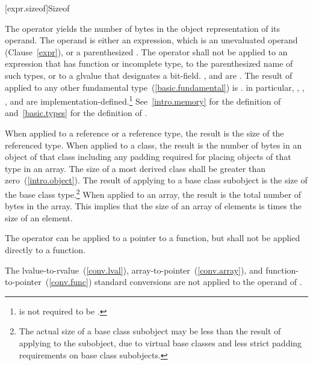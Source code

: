 [expr.sizeof]{Sizeof}

\pnum
{}%
%
%
The  operator yields the number of bytes in the object
representation of its operand. The operand is either an expression,
which is an unevaluated operand (Clause~\ref{expr}), or a parenthesized
.
%
The  operator shall not be applied to an expression that
has function or incomplete type, 
to the parenthesized name of such
types, or to a glvalue that designates a bit-field.
,  and
 are . The result of
 applied to any other fundamental
type~(\ref{basic.fundamental}) is .
\enternote 
in particular, , ,
, and  are
implementation-defined.\footnote{ is not required to be .}
\exitnote 
\enternote 
See~\ref{intro.memory} for the definition of 
and~\ref{basic.types} for the definition of .
\exitnote 

\pnum
{}%
When applied to a reference or a reference type, the result is the size
of the referenced type.
%
When applied to a class, the result is the number of bytes in an object
of that class including any padding required for placing objects of that
type in an array. The size of a most derived class shall be greater than
zero~(\ref{intro.object}). The result of applying  to a
base class subobject is the size of the base class type.\footnote{The actual
size of a base class subobject may be less than the result of
applying  to the subobject, due to virtual base classes
and less strict padding requirements on base class subobjects.}
%
When applied to an array, the result is the total number of bytes in the
array. This implies that the size of an array of  elements is
 times the size of an element.

\pnum
The  operator can be applied to a pointer to a function,
but shall not be applied directly to a function.

\pnum
The lvalue-to-rvalue~(\ref{conv.lval}),
array-to-pointer~(\ref{conv.array}), and
function-to-pointer~(\ref{conv.func}) standard conversions are not
applied to the operand of .

